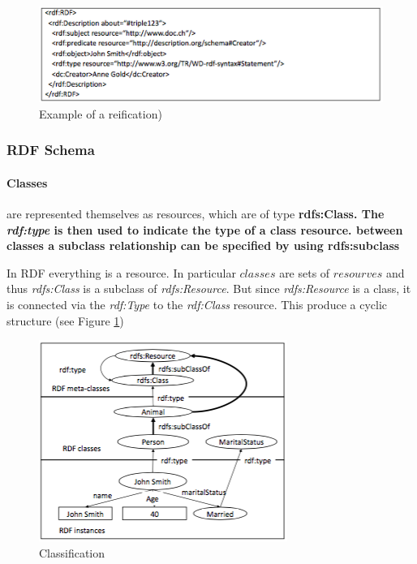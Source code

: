 \begin{figure}[H]
\begin{center}
\includegraphics[width=\textwidth]{figures/reification.png}
\end{center}
\caption{Example of a reification)}
\end{figure}

\subsubsection{RDF Schema}

\paragraph{Classes} are represented themselves as resources, which are of type \bf{rdfs:Class}. The \textit{rdf:type} is then used to indicate the type of a class resource. between classes a subclass relationship can be specified by using \bf{rdfs:subclass}

In RDF everything is a resource. In particular $classes$ are sets of $resourves$ and thus \textit{rdfs:Class} is a subclass of \textit{rdfs:Resource}. But since \textit{rdfs:Resource} is a class, it is connected via the \textit{rdf:Type} to the \textit{rdf:Class} resource. This produce a cyclic structure (see Figure \ref{fig:class})

\begin{figure}[H]
\begin{center}
\includegraphics[width=\textwidth]{figures/class.png}
\end{center}
\caption{Classification}
\label{fig:class}
\end{figure}

